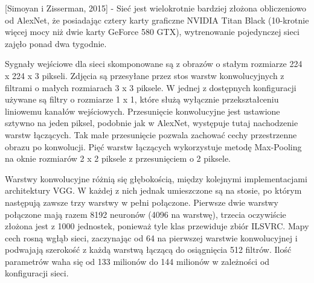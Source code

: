 \documentclass[12pt,a4paper,twoside,titlepage,openright]{book}
\begin{document}
 [Simoyan i Zisserman, 2015] - %
Sieć jest wielokrotnie bardziej złożona obliczeniowo od AlexNet, że posiadając cztery karty graficzne NVIDIA Titan Black (10-krotnie więcej mocy niż dwie karty GeForce 580 GTX), wytrenowanie pojedynczej sieci zajęło ponad dwa tygodnie.

Sygnały wejściowe dla sieci skomponowane są z obrazów o stałym rozmiarze 224 x 224 x 3 pikseli. Zdjęcia są przesyłane przez stos warstw konwolucyjnych z filtrami o małych rozmiarach 3 x 3 piksele. W jednej z dostępnych konfiguracji używane są filtry o rozmiarze 1 x 1, które służą wyłącznie przekształceniu liniowemu kanałów wejściowych. Przesunięcie konwolucyjne jest ustawione sztywno na jeden piksel, podobnie jak w AlexNet, występuje tutaj nachodzenie warstw łączących. Tak małe przesunięcie pozwala zachować cechy przestrzenne obrazu po konwolucji. Pięć warstw łączących wykorzystuje metodę Max-Pooling na oknie rozmiarów 2 x 2 piksele z przesunięciem o 2 piksele.

Warstwy konwolucyjne różnią się głębokością, między kolejnymi implementacjami architektury VGG. W każdej z nich jednak umieszczone są na stosie, po którym następują zawsze trzy warstwy w pełni połączone. Pierwsze dwie warstwy połączone mają razem 8192 neuronów (4096 na warstwę), trzecia oczywiście złożona jest z 1000 jednostek, ponieważ tyle klas przewiduje zbiór ILSVRC. Mapy cech rosną wgłąb sieci, zaczynając od 64 na pierwszej warstwie konwolucyjnej i podwajają szerokość z każdą warstwą łączącą do osiągnięcia 512 filtrów. Ilość parametrów waha się od 133 milionów do 144 milionów w zależności od konfiguracji sieci.
\end{document}
